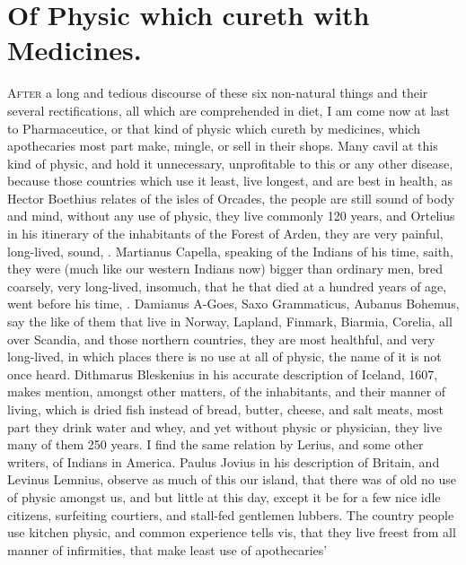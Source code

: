 {%

\section{Of Physic which cureth with Medicines.}

\lettrine{A}{fter} a long and tedious discourse of these six non-natural things and
their several rectifications, all which are comprehended in diet, I am
come now at last to Pharmaceutice, or that kind of physic which cureth
by medicines, which apothecaries most part make, mingle, or sell in
their shops. Many cavil at this kind of physic, and hold it
unnecessary, unprofitable to this or any other disease, because those
countries which use it least, live longest, and are best in health, as
Hector Boethius relates of the isles of Orcades, the people are
still sound of body and mind, without any use of physic, they live
commonly 120 years, and Ortelius in his itinerary of the inhabitants of
the Forest of Arden,  they are very painful, long-lived, sound,
\etc{}. Martianus Capella, speaking of the Indians of his time,
saith, they were (much like our western Indians now) bigger than
ordinary men, bred coarsely, very long-lived, insomuch, that he that
died at a hundred years of age, went before his time, \etc{}. Damianus
A-Goes, Saxo Grammaticus, Aubanus Bohemus, say the like of them that
live in Norway, Lapland, Finmark, Biarmia, Corelia, all over Scandia,
and those northern countries, they are most healthful, and very
long-lived, in which places there is no use at all of physic, the name
of it is not once heard. Dithmarus Bleskenius in his accurate
description of Iceland, 1607, makes mention, amongst other matters, of
the inhabitants, and their manner of living, which is dried fish
instead of bread, butter, cheese, and salt meats, most part they drink
water and whey, and yet without physic or physician, they live many of
them 250 years. I find the same relation by Lerius, and some other
writers, of Indians in America. Paulus Jovius in his description of
Britain, and Levinus Lemnius, observe as much of this our island, that
there was of old no use of physic amongst us, and but little at
this day, except it be for a few nice idle citizens, surfeiting
courtiers, and stall-fed gentlemen lubbers. The country people use
kitchen physic, and common experience tells vis, that they live freest
from all manner of infirmities, that make least use of apothecaries'
}

